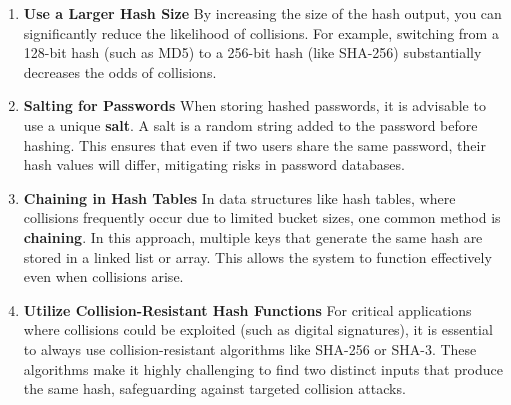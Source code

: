\documentclass[11pt,a4paper]{article}
\begin{document}
        \begin{enumerate}
            \item \textbf{Use a Larger Hash Size}
            \newline
            By increasing the size of the hash output, you can significantly reduce the likelihood of collisions. For example, switching from a 128-bit hash (such as MD5) to a 256-bit hash (like SHA-256) substantially decreases the odds of collisions.

            \item \textbf{Salting for Passwords}
            \newline
            When storing hashed passwords, it is advisable to use a unique \textbf{salt}. A salt is a random string added to the password before hashing. This ensures that even if two users share the same password, their hash values will differ, mitigating risks in password databases.

            \item \textbf{Chaining in Hash Tables}
            \newline
            In data structures like hash tables, where collisions frequently occur due to limited bucket sizes, one common method is \textbf{chaining}. In this approach, multiple keys that generate the same hash are stored in a linked list or array. This allows the system to function effectively even when collisions arise.

            \item \textbf{Utilize Collision-Resistant Hash Functions}
            \newline
            For critical applications where collisions could be exploited (such as digital signatures), it is essential to always use collision-resistant algorithms like SHA-256 or SHA-3. These algorithms make it highly challenging to find two distinct inputs that produce the same hash, safeguarding against targeted collision attacks.

        \end{enumerate}
\end{document}
